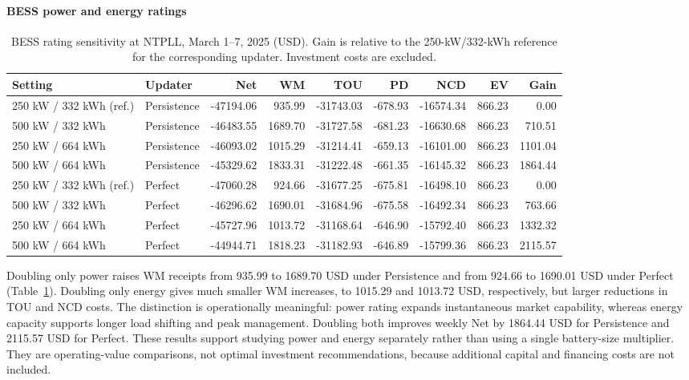 \documentclass[final,5p,times]{elsarticle}
\begin{document}
\paragraph{BESS power and energy ratings}
\begin{table}[p]
\centering
\caption{BESS rating sensitivity at NTPLL, March 1--7, 2025 (USD). Gain is relative to the 250-kW/332-kWh reference for the corresponding updater. Investment costs are excluded.}
\label{tab:weekly_bess}
\footnotesize
\setlength{\tabcolsep}{3pt}
\begin{tabular}{llrrrrrrr}
\toprule
Setting & Updater & Net & WM & TOU & PD & NCD & EV & Gain \\
\midrule
250 kW / 332 kWh (ref.) & Persistence & -47194.06 & 935.99 & -31743.03 & -678.93 & -16574.34 & 866.23 & 0.00 \\
500 kW / 332 kWh & Persistence & -46483.55 & 1689.70 & -31727.58 & -681.23 & -16630.68 & 866.23 & 710.51 \\
250 kW / 664 kWh & Persistence & -46093.02 & 1015.29 & -31214.41 & -659.13 & -16101.00 & 866.23 & 1101.04 \\
500 kW / 664 kWh & Persistence & -45329.62 & 1833.31 & -31222.48 & -661.35 & -16145.32 & 866.23 & 1864.44 \\
\midrule
250 kW / 332 kWh (ref.) & Perfect & -47060.28 & 924.66 & -31677.25 & -675.81 & -16498.10 & 866.23 & 0.00 \\
500 kW / 332 kWh & Perfect & -46296.62 & 1690.01 & -31684.96 & -675.58 & -16492.34 & 866.23 & 763.66 \\
250 kW / 664 kWh & Perfect & -45727.96 & 1013.72 & -31168.64 & -646.90 & -15792.40 & 866.23 & 1332.32 \\
500 kW / 664 kWh & Perfect & -44944.71 & 1818.23 & -31182.93 & -646.89 & -15799.36 & 866.23 & 2115.57 \\
\bottomrule
\end{tabular}
\end{table}

Doubling only power raises WM receipts from 935.99 to 1689.70 USD under
Persistence and from 924.66 to 1690.01 USD under Perfect
(Table~\ref{tab:weekly_bess}). Doubling only energy gives much smaller WM
increases, to 1015.29 and 1013.72 USD, respectively, but larger reductions in
TOU and NCD costs. The distinction is operationally meaningful: power rating
expands instantaneous market capability, whereas energy capacity supports
longer load shifting and peak management. Doubling both improves weekly Net
by 1864.44 USD for Persistence and 2115.57 USD for Perfect. These results
support studying power and energy separately rather than using a single
battery-size multiplier. They are operating-value comparisons, not optimal
investment recommendations, because additional capital and financing costs
are not included.
\end{document}
